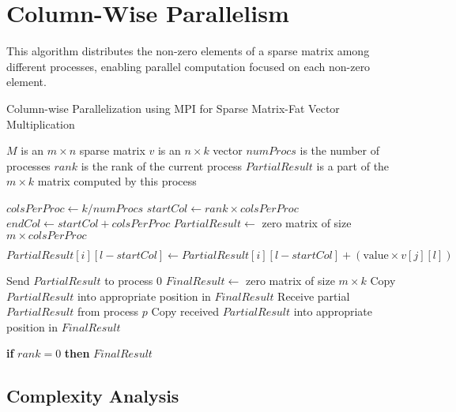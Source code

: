 \documentclass[12pt,oneside]{book} %
\begin{document}
\newpage
\section{Column-Wise Parallelism}
This algorithm distributes the non-zero elements of a sparse matrix among
different processes, enabling parallel computation focused on each non-zero
element.

\begin{algorithm}
    \caption{Column-wise Parallelization using MPI for Sparse Matrix-Fat Vector Multiplication}
    \begin{algorithmic}
        \Require $M$ is an $m \times n$ sparse matrix
        \Require $v$ is an $n \times k$ vector
        \Require $numProcs$ is the number of processes
        \Require $rank$ is the rank of the current process
        \Ensure  $PartialResult$ is a part of the $m \times k$ matrix computed by this process

        \State $colsPerProc \gets k / numProcs$
        \State $startCol \gets rank \times colsPerProc$
        \State $endCol \gets startCol + colsPerProc$
        \State $PartialResult \gets$ zero matrix of size $m \times colsPerProc$

        \State $PartialResult[i][l - startCol] \gets PartialResult[i][l - startCol] + (\text{value} \times v[j][l])$
        \EndFor
        \EndFor
        \EndFor

        \State Send $PartialResult$ to process $0$
        \Else
        \State $FinalResult \gets$ zero matrix of size $m \times k$
        \State Copy $PartialResult$ into appropriate position in $FinalResult$
        \State Receive partial $PartialResult$ from process $p$
        \State Copy received $PartialResult$ into appropriate position in $FinalResult$
        \EndFor
        \EndIf

        \State \textbf{if} $rank = 0$ \textbf{then} \Return $FinalResult$
    \end{algorithmic}
\end{algorithm}

\subsection{Complexity Analysis}
\end{document}
